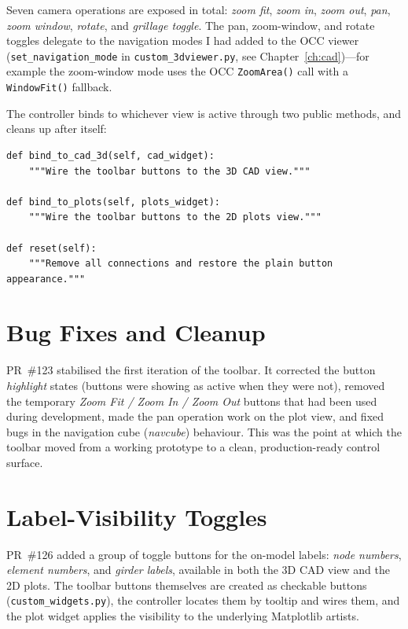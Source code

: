 Seven camera operations are exposed in total: \emph{zoom fit}, \emph{zoom in}, \emph{zoom
out}, \emph{pan}, \emph{zoom window}, \emph{rotate}, and \emph{grillage toggle}. The pan,
zoom-window, and rotate toggles delegate to the navigation modes I had added to the OCC viewer
(\texttt{set\_navigation\_mode} in \texttt{custom\_3dviewer.py}, see
Chapter~\ref{ch:cad})---for example the zoom-window mode uses the OCC \texttt{ZoomArea()} call
with a \texttt{WindowFit()} fallback.

The controller binds to whichever view is active through two public methods, and cleans up
after itself:
\begin{lstlisting}[caption={Binding the controller to a view, and resetting it.},label={lst:tbbind}]
def bind_to_cad_3d(self, cad_widget):
    """Wire the toolbar buttons to the 3D CAD view."""

def bind_to_plots(self, plots_widget):
    """Wire the toolbar buttons to the 2D plots view."""

def reset(self):
    """Remove all connections and restore the plain button appearance."""
\end{lstlisting}

\section{Bug Fixes and Cleanup}
PR~\#123 stabilised the first iteration of the toolbar. It corrected the button
\emph{highlight} states (buttons were showing as active when they were not), removed the
temporary \emph{Zoom Fit / Zoom In / Zoom Out} buttons that had been used during development,
made the pan operation work on the plot view, and fixed bugs in the navigation cube
(\emph{navcube}) behaviour. This was the point at which the toolbar moved from a working
prototype to a clean, production-ready control surface.

\section{Label-Visibility Toggles}
PR~\#126 added a group of toggle buttons for the on-model labels: \emph{node numbers},
\emph{element numbers}, and \emph{girder labels}, available in both the 3D CAD view and the 2D
plots. The toolbar buttons themselves are created as checkable buttons
(\texttt{custom\_widgets.py}), the controller locates them by tooltip and wires them, and the
plot widget applies the visibility to the underlying Matplotlib artists.


